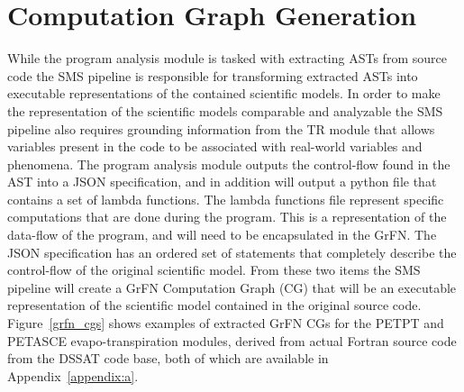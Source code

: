 \section{Computation Graph Generation\label{sec:cg_gen}}
While the program analysis module is tasked with extracting ASTs from source code the SMS pipeline is responsible for transforming extracted ASTs into executable representations of the contained scientific models.
In order to make the representation of the scientific models comparable and analyzable the SMS pipeline also requires grounding information from the TR module that allows variables present in the code to be associated with real-world variables and phenomena.
The program analysis module outputs the control-flow found in the AST into a JSON specification, and in addition will output a python file that contains a set of lambda functions.
The lambda functions file represent specific computations that are done during the program.
This is a representation of the data-flow of the program, and will need to be encapsulated in the GrFN.
The JSON specification has an ordered set of statements that completely describe the control-flow of the original scientific model.
From these two items the SMS pipeline will create a GrFN Computation Graph (CG) that will be an executable representation of the scientific model contained in the original source code.
Figure~\ref{grfn_cgs} shows examples of extracted GrFN CGs for the PETPT and PETASCE evapo-transpiration modules, derived from actual Fortran source code from the DSSAT code base, both of which are available in Appendix~\ref{appendix:a}.

